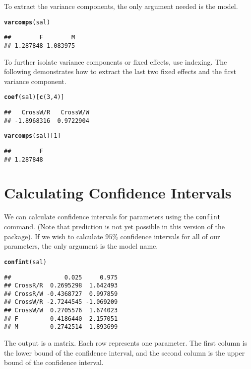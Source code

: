 \documentclass[11pt]{article}\usepackage[]{graphicx}\usepackage[]{color}
\makeatletter
\newcommand{\hlnum}[1]{\textcolor[rgb]{0.686,0.059,0.569}{#1}}%
\newcommand{\hlstd}[1]{\textcolor[rgb]{0.345,0.345,0.345}{#1}}%
\newcommand{\hlkwd}[1]{\textcolor[rgb]{0.737,0.353,0.396}{\textbf{#1}}}%
\newenvironment{kframe}{%
 \def\at@end@of@kframe{}%
 \ifinner\ifhmode%
  \def\at@end@of@kframe{\end{minipage}}%
  \begin{minipage}{\columnwidth}%
 \fi\fi%
 \def\FrameCommand##1{\hskip\@totalleftmargin \hskip-\fboxsep
 \colorbox{shadecolor}{##1}\hskip-\fboxsep
     \hskip-\linewidth \hskip-\@totalleftmargin \hskip\columnwidth}%
 \MakeFramed {\advance\hsize-\width
   \@totalleftmargin\z@ \linewidth\hsize
   \@setminipage}}%
 {\par\unskip\endMakeFramed%
 \at@end@of@kframe}
\newenvironment{knitrout}{}{} %
\makeatother
\begin{document}
To extract the variance components, the only argument needed is the model. 
\begin{knitrout}
\color{fgcolor}\begin{kframe}
\begin{alltt}
\hlkwd{varcomps}\hlstd{(sal)}
\end{alltt}
\begin{verbatim}
##        F        M 
## 1.287848 1.083975
\end{verbatim}
\end{kframe}
\end{knitrout}

To further isolate variance components or fixed effects, use indexing. The following demonstrates how to extract the last two fixed effects and the first variance component.
\begin{knitrout}
\color{fgcolor}\begin{kframe}
\begin{alltt}
\hlkwd{coef}\hlstd{(sal)[}\hlkwd{c}\hlstd{(}\hlnum{3}\hlstd{,}\hlnum{4}\hlstd{)]}
\end{alltt}
\begin{verbatim}
##   CrossW/R   CrossW/W 
## -1.8968316  0.9722904
\end{verbatim}
\begin{alltt}
\hlkwd{varcomps}\hlstd{(sal)[}\hlnum{1}\hlstd{]}
\end{alltt}
\begin{verbatim}
##        F 
## 1.287848
\end{verbatim}
\end{kframe}
\end{knitrout}

\section{Calculating Confidence Intervals}\label{sec:ci}
We can calculate confidence intervals for parameters using the \texttt{confint} command. (Note that prediction is not yet possible in this version of the package).  If we wish to calculate $95\%$ confidence intervals for all of our parameters, the only argument is the model name. 
\begin{knitrout}
\color{fgcolor}\begin{kframe}
\begin{alltt}
\hlkwd{confint}\hlstd{(sal)}
\end{alltt}
\begin{verbatim}
##               0.025     0.975
## CrossR/R  0.2695298  1.642493
## CrossR/W -0.4368727  0.997859
## CrossW/R -2.7244545 -1.069209
## CrossW/W  0.2705576  1.674023
## F         0.4186440  2.157051
## M         0.2742514  1.893699
\end{verbatim}
\end{kframe}
\end{knitrout}
The output is a matrix. Each row represents one parameter. The first column is the lower bound of the confidence interval, and the second column is the upper bound of the confidence interval. \\
\end{document}
